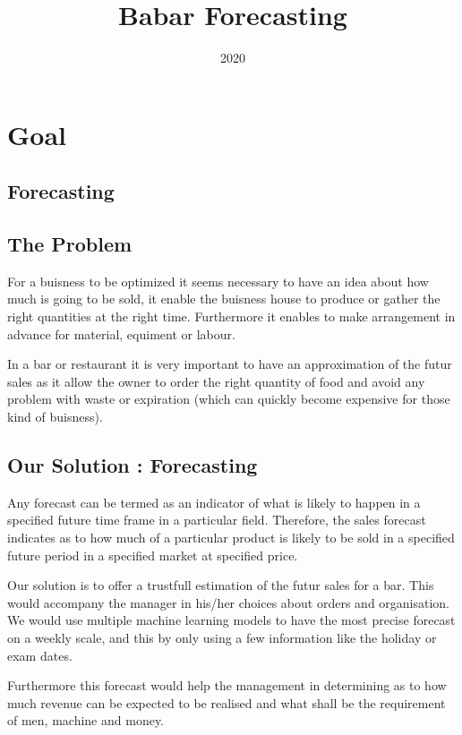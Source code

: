 \documentclass{report}
\title{Babar Forecasting}
\date{2020}
\begin{document}
 
\maketitle

\chapter{Goal}

\section{Forecasting}



\section{The Problem}

For a buisness to be optimized it seems necessary to have an idea about how much is going to be sold, it enable the buisness house to produce or gather the right quantities at the right time. Furthermore it enables to make arrangement in advance for material, equiment or labour.

In a bar or restaurant it is very important to have an approximation of the futur sales as it allow the owner to order the right quantity of food and avoid any problem with waste or expiration (which can quickly become expensive for those kind of buisness). 

\section{Our Solution : Forecasting}

Any forecast can be termed as an indicator of what is likely to happen in a specified future time frame in a particular field. Therefore, the sales forecast indicates as to how much of a particular product is likely to be sold in a specified future period in a specified market at speci­fied price.

Our solution is to offer a trustfull estimation of the futur sales for a bar. This would accompany the manager in his/her choices about orders and organisation. We would use multiple machine learning models to have the most precise forecast on a weekly scale, and this by only using a few information like the holiday or exam dates.

Furthermore this forecast would help the management in determining as to how much revenue can be expected to be realised and what shall be the requirement of men, machine and money.
\end{document}
